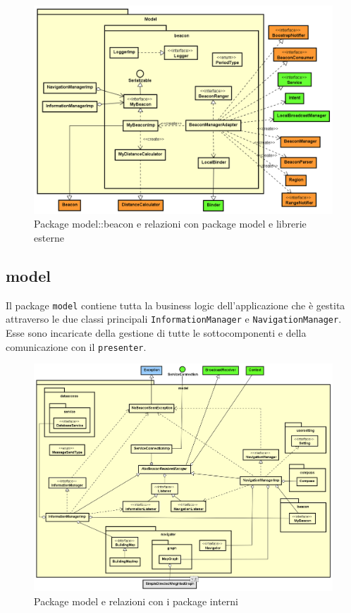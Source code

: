 \documentclass[../DefinizioneDiProdotto.tex,lanscape]{subfiles}
\begin{document}
\begin{figure}[h]
	\includegraphics[width=\textwidth]{img/RelationPackage/beacon}
	\caption{Package model::beacon e relazioni con package model e librerie esterne}
	\label{beaconPackage}
\end{figure}


\newpage
	\subsection{model}
		Il package \verb|model| contiene tutta la business logic dell'applicazione che è gestita attraverso le due classi principali \verb|InformationManager| e \verb|NavigationManager|. Esse sono incaricate della gestione di tutte le sottocomponenti e della comunicazione con il \verb|presenter|.

\begin{figure}[h]
	\includegraphics[width=\textwidth]{img/RelationPackage/model}
	\caption{Package model e relazioni con i package interni}
	\label{modelPackage}
\end{figure}
\end{document}

